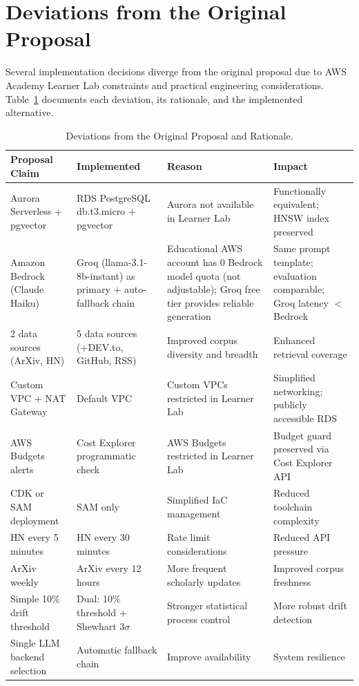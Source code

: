 \documentclass[12pt,a4paper]{report}
\begin{document}
\section{Deviations from the Original Proposal}
\label{sec:deviations}

Several implementation decisions diverge from the original proposal due to AWS Academy Learner Lab constraints and practical engineering considerations. Table~\ref{tab:deviations} documents each deviation, its rationale, and the implemented alternative.

\begin{table}[H]
\caption{Deviations from the Original Proposal and Rationale.}
\label{tab:deviations}
\centering
\begin{tabular}{p{3.0cm}p{3.0cm}p{3.0cm}p{3.5cm}}
\toprule
\textbf{Proposal Claim} & \textbf{Implemented} & \textbf{Reason} & \textbf{Impact} \\
\midrule
Aurora Serverless + pgvector & RDS PostgreSQL db.t3.micro + pgvector & Aurora not available in Learner Lab & Functionally equivalent; HNSW index preserved \\[4pt]
Amazon Bedrock (Claude Haiku) & Groq (llama-3.1-8b-instant) as primary + auto-fallback chain & Educational AWS account has 0 Bedrock model quota (not adjustable); Groq free tier provides reliable generation & Same prompt template; evaluation comparable; Groq latency $<$ Bedrock \\[4pt]
2 data sources (ArXiv, HN) & 5 data sources (+DEV.to, GitHub, RSS) & Improved corpus diversity and breadth & Enhanced retrieval coverage \\[4pt]
Custom VPC + NAT Gateway & Default VPC & Custom VPCs restricted in Learner Lab & Simplified networking; publicly accessible RDS \\[4pt]
AWS Budgets alerts & Cost Explorer programmatic check & AWS Budgets restricted in Learner Lab & Budget guard preserved via Cost Explorer API \\[4pt]
CDK or SAM deployment & SAM only & Simplified IaC management & Reduced toolchain complexity \\[4pt]
HN every 5 minutes & HN every 30 minutes & Rate limit considerations & Reduced API pressure \\[4pt]
ArXiv weekly & ArXiv every 12 hours & More frequent scholarly updates & Improved corpus freshness \\[4pt]
Simple 10\% drift threshold & Dual: 10\% threshold + Shewhart $3\sigma$ & Stronger statistical process control & More robust drift detection \\[4pt]
Single LLM backend selection & Automatic fallback chain & Improve availability & System resilience \\
\bottomrule
\end{tabular}
\end{table}
\end{document}
